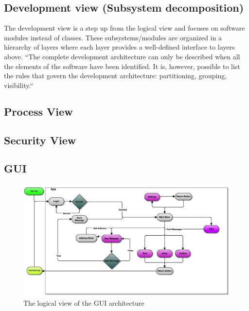 \subsection{Development view (Subsystem decomposition)}
The development view is a step up from the logical view and focuses on software modules instead of classes. These subsystems/modules are organized in a hierarchy of layers where each layer provides a well-defined interface to layers above. “The complete development architecture can only be described when all the elements of the software have been identified. It is, however, possible to list the rules that govern the development architecture: partitioning, grouping, visibility.“
\subsection{Process View}
\subsection{Security View}

\subsection{GUI}
\begin{figure}
	\includegraphics[width=\textwidth]{Android_GUI_flow_chart_2}
	\caption{The logical view of the GUI architecture}
	\label{fig:logicalGUIview}
\end{figure}